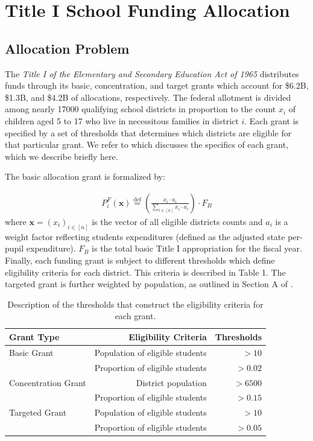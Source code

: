 \section*{Title I School Funding Allocation}

\subsection{Allocation Problem}
The \emph{Title I of the Elementary and Secondary Education Act of
1965} \cite{Sonnenberg:16} distributes funds through its basic, concentration, and target grants which account for \$6.2B, \$1.3B, and \$4.2B of allocations, respectively. The federal allotment is divided among nearly 17000 qualifying school
districts in proportion to the count $x_i$ of children aged 5 to 17
who live in necessitous families in district $i$. Each grant is specified by a set of thresholds that determines which districts are eligible for that particular grant. We refer to \cite{Sonnenberg:16} which discusses the specifics of each grant, which we describe briefly here.

The basic allocation grant is formalized by:
\newcommand{\tfa}{P^F}
\newcommand{\rev}[1]{{\color{purple}{#1}}}
\newcommand{\add}[1]{{\color{darkgreen}{#1}}}
\newcommand*{\defeq}{\stackrel{\text{def}}{=}}
\def\aux{\mathrm{aux}}

\begin{align}
	\label{eq:allotment}%
	\tfa_i(\bm{x}) \defeq \left(
	\frac{x_i \cdot a_i}{\sum_{i \in [n] }x_i \cdot a_i}\right) \cdot F_{B}
\end{align}
where $\bm{x} = (x_i)_{i\in[n]}$ is the vector of all eligible districts counts
and $a_i$ is a weight factor reflecting students expenditures (defined as the adjusted state per-pupil expenditure). $F_{B}$ is the total basic Title I appropriation for the fiscal year. Finally, each funding grant is subject to different thresholds which define eligibility criteria for each district. This criteria is described in Table 1. The targeted grant is further weighted by population, as outlined in Section A of \cite{Sonnenberg:16}.

\begin{table}[t!]
	\centering
	\caption{Description of the thresholds that construct the eligibility criteria for each grant.}
	\begin{tabular}{lrr}
		\toprule
		Grant Type        & Eligibility Criteria            & Thresholds \\
		\midrule
		Basic Grant         & Population of eligible students & $>10$      \\
		& Proportion of eligible students & $>0.02$    \\
		Concentration Grant & District population             & $>6500$    \\
		& Proportion of eligible students & $>0.15$    \\
		Targeted Grant      & Population of eligible students & $>10$      \\
		& Proportion of eligible students & $>0.05$    \\
		\bottomrule
	\end{tabular}
	\medskip
	\raggedright
\end{table}

